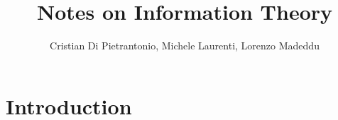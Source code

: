 \documentclass[a4paper, 11pt]{book}
\title{Notes on Information Theory}
\author{Cristian Di Pietrantonio, Michele Laurenti, Lorenzo Madeddu}
\begin{document}
	\maketitle
	
	\chapter{Introduction}
	
	
	
	
\end{document}
